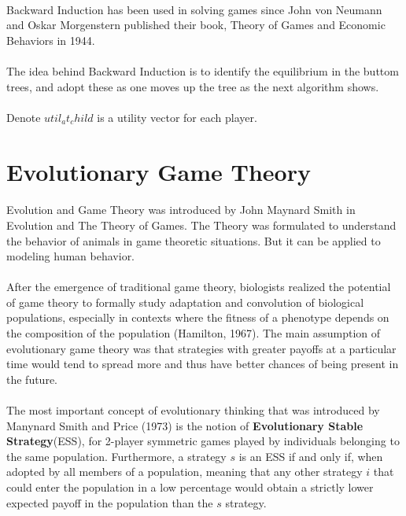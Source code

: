 \paragraph{}Backward Induction has been used in solving games since John von Neumann and Oskar Morgenstern published their book, Theory of Games and Economic Behaviors in 1944.
\paragraph{}The idea behind Backward Induction is to identify the equilibrium in the buttom trees, and adopt these as one moves up the tree as the next algorithm shows.


\paragraph{} Denote $util_at_child$ is a utility vector for each player.
\section{Evolutionary Game Theory}

\paragraph{}Evolution and Game Theory was introduced by John Maynard Smith in Evolution and The Theory of Games. The Theory was formulated to understand the behavior of animals in game theoretic situations. But it can be applied to modeling human behavior.

\paragraph{}After the emergence of traditional game theory, biologists realized the potential of game theory to formally study adaptation and convolution of biological populations, especially in contexts where the fitness of a phenotype depends on the composition of the population (Hamilton, 1967). The main assumption of evolutionary game theory was that strategies with greater payoffs at a particular time would tend to spread more and thus have better chances of being present in the future.
\paragraph{}The most important concept of evolutionary thinking that was introduced by Manynard Smith and Price (1973) is the notion of \textbf{Evolutionary Stable Strategy}(ESS), for 2-player symmetric games played by individuals belonging to the same population. Furthermore, a strategy $s$ is an ESS if and only if, when adopted by all members of a population, meaning that any other strategy $i$ that could enter the population in a low percentage would obtain a strictly  lower expected payoff in the population than the $s$ strategy.
